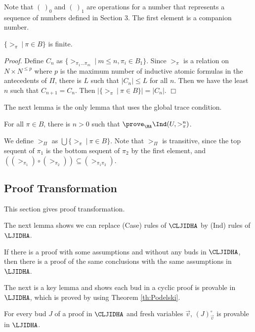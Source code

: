 Note that $(\ )_0$ and $(\ )_1$ are operations for a number that represents
a sequence of numbers defined in Section 3.
The first element is a companion number.

\begin{Lemma}\label{lemma:finite}
$\{ >_{\pi} \ |\ \pi \in B \}$ is finite.
\end{Lemma}

{\em Proof.}
Define $C_n$ as $\{ >_{\pi_1\ldots \pi_m} \ |\ m \le n, \pi_i \in B_1 \}$.
Since $>_{\pi}$ is a relation on $N \times N^{\le p}$ where
$p$ is the maximum number of inductive atomic formulas in the antecedents of $\Pi$,
there is $L$ such that $|C_n| \le L$ for all $n$.
Then we have the least $n$ such that $C_{n+1}=C_n$.
Then $|\{ >_{\pi} \ |\ \pi \in B \}|=|C_n|$.
$\Box$

The next lemma is the only lemma that uses the global trace condition.

\begin{Lemma}\label{lemma:globaltrace}
For all $\pi \in B$, there is $n>0$ such that
$\prove_\HA \Ind(U,>_\pi^n)$.
\end{Lemma}

We define $>_\Pi$ as $\bigcup \{ >_{\pi} \ |\ \pi \in B \}$.
Note that $>_\Pi$ is transitive,
since 
the top sequent of $\pi_1$
is the bottom sequent of $\pi_2$ by the first element, and
$((>_{\pi_1}) \circ (>_{\pi_2})) \subseteq (>_{\pi_1\pi_2})$.

\subsection{Proof Transformation}

This section gives proof transformation.

The next lemma shows
we can replace (Case) rules of $\CLJIDHA$ 
by (Ind) rules of $\LJIDHA$.
\begin{Lemma}\label{lemma:case-ind}
If there is a proof
with some assumptions
and without any buds in $\CLJIDHA$,
then
there is a proof of the same conclusions with the same assumptions
in $\LJIDHA$.
\end{Lemma}

The next is a key lemma and shows each bud in a cyclic proof
is provable in $\LJIDHA$, which is proved by using Theorem \ref{th:Podelski}.
\begin{Lemma}\label{lemma:prooftrans}
For every bud $J$ of a proof in $\CLJIDHA$ and fresh variables $\Vec v$,
$(J)^\circ_{\Vec v}$ is provable in $\LJIDHA$.
\end{Lemma}

